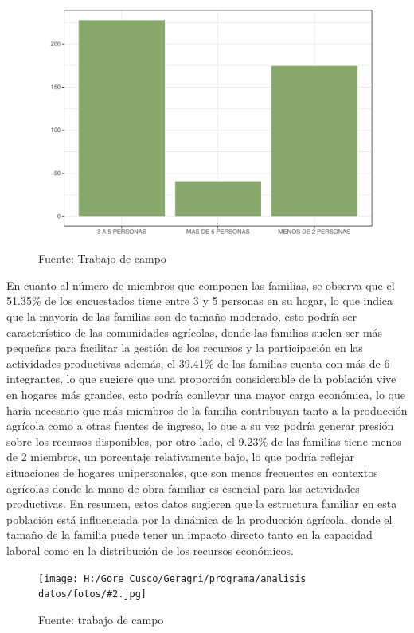 \documentclass{article}\usepackage[]{graphicx}\usepackage[table]{xcolor}
\makeatletter
\def\maxwidth{ %
  \ifdim\Gin@nat@width>\linewidth
    \linewidth
  \else
    \Gin@nat@width
  \fi
}
\newenvironment{knitrout}{}{} %
\newenvironment{fotos}[2]
{\begin{figure}[H]
	\centering
	\caption{#1}
	\texttt{[image: H:/Gore Cusco/Geragri/programa/analisis datos/fotos/\#2.jpg]}
	\caption*{Fuente: trabajo de campo}}
{\end{figure}}
\makeatother
\begin{document}
\begin{figure}[H]
  \centering
  \caption{Numero de integrantes que conforman su familia}
\begin{knitrout}
\color{fgcolor}
\includegraphics[width=\maxwidth]{figure/fig_siete-1} 
\end{knitrout}
  \caption*{Fuente: Trabajo de campo}
\end{figure}
En cuanto al número de miembros que componen las familias, se observa que el 51.35\% de los encuestados tiene entre 3 y 5 personas en su hogar, lo que indica que la mayoría de las familias son de tamaño moderado, esto podría ser característico de las comunidades agrícolas, donde las familias suelen ser más pequeñas para facilitar la gestión de los recursos y la participación en las actividades productivas además, el 39.41\% de las familias cuenta con más de 6 integrantes, lo que sugiere que una proporción considerable de la población vive en hogares más grandes, esto podría conllevar una mayor carga económica, lo que haría necesario que más miembros de la familia contribuyan tanto a la producción agrícola como a otras fuentes de ingreso, lo que a su vez podría generar presión sobre los recursos disponibles, por otro lado, el 9.23\% de las familias tiene menos de 2 miembros, un porcentaje relativamente bajo, lo que podría reflejar situaciones de hogares unipersonales, que son menos frecuentes en contextos agrícolas donde la mano de obra familiar es esencial para las actividades productivas. En resumen, estos datos sugieren que la estructura familiar en esta población está influenciada por la dinámica de la producción agrícola, donde el tamaño de la familia puede tener un impacto directo tanto en la capacidad laboral como en la distribución de los recursos económicos.
\begin{fotos}
{Aplicacion de encuestas en el area de influencia}{5}
\end{fotos}
\end{document}
